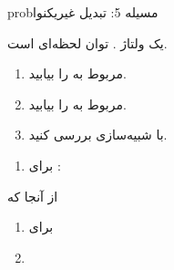 \begin{PSbox}[unbreakable]{prob}{مسیله 5: تبدیل غیریکنوا}

یک ولتاژ . توان لحظه‌ای  است.

\begin{enumerate}
\def\labelenumi{(\PSalph{enumi})}
\tightlist
\item
   مربوط به  را بیابید.
\item
   مربوط به  را بیابید.
\item
  با شبیه‌سازی  بررسی کنید.
\end{enumerate}

\PSsolution{} 

\begin{enumerate}
\def\labelenumi{(\PSalph{enumi})}
\tightlist
\item
  برای :\PSbr{}
\end{enumerate}

از آنجا که 


\begin{enumerate}
\def\labelenumi{(\PSalph{enumi})}
\setcounter{enumi}{1}
\item
   برای 
\item
\end{enumerate}



\end{PSbox}
